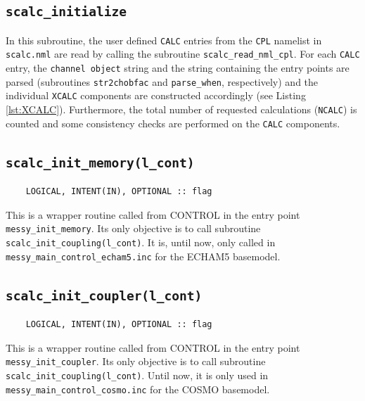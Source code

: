 \documentclass[twoside]{article}
\begin{document}
\subsection{{\tt scalc\_initialize}}
\label{sec:scalc_initialize}
%
In this subroutine, the user defined {\tt CALC} entries from the {\tt CPL} namelist in {\tt scalc.nml} are read by calling the subroutine {\tt scalc\_read\_nml\_cpl}.
For each {\tt CALC} entry, the {\tt channel object} string and the string containing the entry points are parsed (subroutines {\tt str2chobfac} and {\tt parse\_when}, respectively)
and the individual {\tt XCALC} components  are constructed accordingly (see Listing \ref{lst:XCALC}).
Furthermore, the total number of requested calculations ({\tt NCALC}) is counted and some consistency checks are performed on the {\tt CALC} components.
%
\subsection{{\tt scalc\_init\_memory(l\_cont)}}
\label{sec:scalc_init_memory}
%
\begin{verbatim}
    LOGICAL, INTENT(IN), OPTIONAL :: flag
\end{verbatim}
This is a wrapper routine called from CONTROL in the entry point {\tt messy\_init\_memory}.
Its only objective is to call subroutine {\tt scalc\_init\_coupling(l\_cont)}.
It is, until now, only called in {\tt messy\_main\_control\_echam5.inc} for the ECHAM5 basemodel.
%
\subsection{{\tt scalc\_init\_coupler(l\_cont)}}
\label{sec:scalc_init_coupler}
%
\begin{verbatim}
    LOGICAL, INTENT(IN), OPTIONAL :: flag
\end{verbatim}
This is a wrapper routine called from CONTROL in the entry point {\tt messy\_init\_coupler}.
Its only objective is to call subroutine {\tt scalc\_init\_coupling(l\_cont)}.
Until now, it is only used in {\tt messy\_main\_control\_cosmo.inc} for the COSMO basemodel.
%
\end{document}
